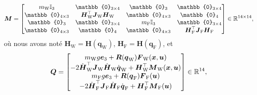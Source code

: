 
\begin{align}
    \boldsymbol{M} = \begin{bmatrix}
        m_{\text{W}} \mathbb{I}_{3} & \mathbb{0}_{3 \times 4} & \mathbb{0}_{3} & \mathbb{0}_{3 \times 4}\\
        \mathbb{0}_{4 \times 3} & \boldsymbol{H}_{\text{W}}^\top \boldsymbol{J}_{\text{W}} \boldsymbol{H}_{\text{W}} & \mathbb{0}_{4 \times 3} & \mathbb{0}_{4}\\
        \mathbb{0}_{3} & \mathbb{0}_{3 \times 4} & m_{\text{F}} \mathbb{I}_{3} & \mathbb{0}_{3 \times 4} \\
        \mathbb{0}_{4 \times 3} & \mathbb{0}_{4 } & \mathbb{0}_{4 \times 3} & \boldsymbol{H}_{\text{F}}^\top \boldsymbol{J}_{\text{F}} \boldsymbol{H}_{\text{F}}    \end{bmatrix}\in \real^{14\times14},
\end{align}
où nous avons noté $\boldsymbol{H}_{\text{W}} = \boldsymbol{H}(\boldsymbol{q}_{\text{W}})$, $\boldsymbol{H}_{\text{F}} = \boldsymbol{H}(\boldsymbol{q}_{\text{F}})$, et
\begin{align}
    \label{eq:Q}
    \boldsymbol{Q} = \begin{bmatrix}
            m_{\text{W}} g \boldsymbol{e}_3 + \boldsymbol{R}(\boldsymbol{q}_{\text{W}}) \boldsymbol{F}_{\text{W}}(\boldsymbol{x}, \boldsymbol{u})\\
            -2\dot{\boldsymbol{H}}_{\text{W}}^\top \boldsymbol{J}_{\text{W}} \dot{\boldsymbol{H}}_{\text{W}} \dot{\boldsymbol{q}}_{\text{W}} + \boldsymbol{H}_{\text{W}}^\top \boldsymbol{M}_{\text{W}}(\boldsymbol{x}, \boldsymbol{u})\\
            m_{\text{F}} g \boldsymbol{e}_3 + \boldsymbol{R}(\boldsymbol{q}_{\text{F}}) \boldsymbol{F}_{\text{F}}(\boldsymbol{u})\\
            -2\dot{\boldsymbol{H}}_{\text{F}}^\top \boldsymbol{J}_{\text{F}} \dot{\boldsymbol{H}}_{\text{F}} \dot{\boldsymbol{q}}_{\text{F}} + \boldsymbol{H}_{\text{F}}^\top \boldsymbol{M}_{\text{F}}(\boldsymbol{u})\\
        \end{bmatrix} \in {\mathbb R}^{14},
\end{align}



